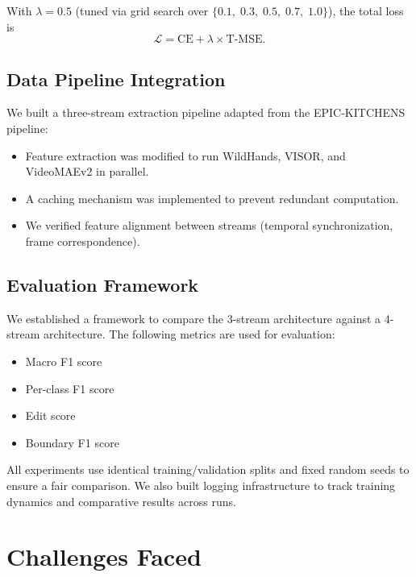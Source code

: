 \documentclass[11pt,a4paper]{article}
\begin{document}
\noindent With $\lambda = 0.5$ (tuned via grid search over $\{0.1,\; 0.3,\; 0.5,\; 0.7,\; 1.0\}$), the total loss is
\[
  \mathcal{L} = \mathrm{CE} + \lambda \times \mathrm{T\text{-}MSE}.
\]

\subsection{Data Pipeline Integration}

We built a three-stream extraction pipeline adapted from the EPIC-KITCHENS pipeline:

\begin{itemize}[nosep]
  \item Feature extraction was modified to run WildHands, VISOR, and VideoMAEv2 in parallel.
  \item A caching mechanism was implemented to prevent redundant computation.
  \item We verified feature alignment between streams (temporal synchronization, frame correspondence).
\end{itemize}

\subsection{Evaluation Framework}

We established a framework to compare the 3-stream architecture against a 4-stream architecture. The following metrics are used for evaluation:

\begin{itemize}[nosep]
  \item Macro F1 score
  \item Per-class F1 score
  \item Edit score
  \item Boundary F1 score
\end{itemize}

\noindent All experiments use identical training/validation splits and fixed random seeds to ensure a fair comparison. We also built logging infrastructure to track training dynamics and comparative results across runs.

\section{Challenges Faced}
\end{document}

